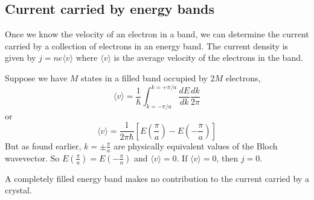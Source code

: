 \documentclass[a4paper, 11pt, normalem]{report}
\begin{document}
\section{Current carried by energy bands}
Once we know the velocity of an electron in a band, we can determine the current carried by a collection of electrons in an energy band. 
The current density is given by $j = ne\langle v\rangle$ where $\langle v\rangle$ is the average velocity of the electrons in the band.

Suppose we have $M$ states in a filled band occupied by $2M$ electrons, 
\begin{equation}
    \langle v\rangle = \frac{1}{\hbar} \int_{k = -\pi/a}^{k=+\pi/a} \frac{dE}{dk}\frac{dk}{2\pi}
\end{equation}
or 
\begin{equation}
    \langle v\rangle = \frac{1}{2\pi\hbar} \left[E\left(\frac{\pi}{a}\right) - E\left(-\frac{\pi}{a}\right)\right]
\end{equation}
But as found earlier, $k = \pm \frac{\pi}{a}$ are physically equivalent values of the Bloch wavevector.
So $E\left(\frac{\pi}{a}\right) = E\left(-\frac{\pi}{a}\right)$ and $\langle v\rangle = 0$.
If $\langle v\rangle = 0$, then $j = 0$.

A completely filled energy band makes no contribution to the current carried by a crystal.

\chapter{}
\end{document}
